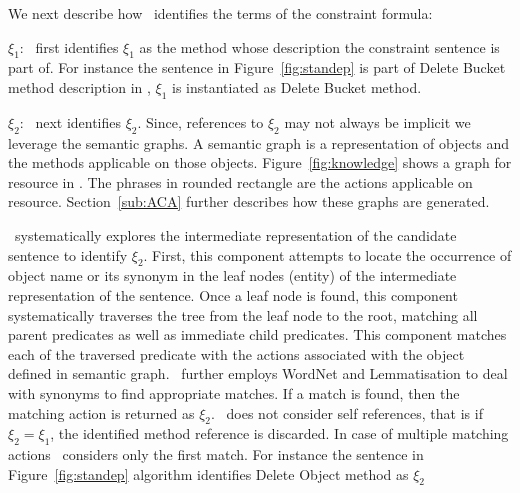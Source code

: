 We next describe how \tool\ identifies the terms of the constraint formula:


\textbf{$\xi_1$}:
\tool\ first identifies $\xi_1$ as the method whose description the constraint sentence is part of.
For instance the sentence in Figure~\ref{fig:standep} is part of Delete Bucket method description in \amazonAPI,
$\xi_1$ is instantiated as Delete Bucket method.


\textbf{$\xi_2$}:
\tool\ next identifies $\xi_2$. Since, references to $\xi_2$ may not always be implicit we leverage the semantic graphs. 
A semantic graph is a representation of objects and the methods applicable on those objects.
Figure~\ref{fig:knowledge} shows a graph for  resource in \amazonAPI.
The phrases in rounded rectangle are the actions applicable on  resource.
Section~\ref{sub:ACA} further describes how these graphs are generated.


\tool\ systematically explores the intermediate representation
of the candidate sentence to identify $\xi_2$. First, this component
attempts to locate the occurrence of object name or its synonym
in the leaf nodes (entity) of the intermediate
representation of the sentence.
Once a leaf node is found, this component systematically
traverses the tree from the leaf node to the root,
matching all parent predicates as well as immediate child
predicates.
This component matches each of the traversed predicate
with the actions associated with the object defined in
semantic graph. 
\tool\ further employs WordNet and Lemmatisation to deal with
synonyms to find appropriate matches. If a match is
found, then the matching action is returned as $\xi_2$.
\tool\ does not consider self references, that is if $\xi_2 = \xi_1$, the identified method reference is discarded.
In case of multiple matching actions \tool\ considers only the first match.
For instance the sentence in Figure~\ref{fig:standep} algorithm identifies
Delete Object method as $\xi_2$

